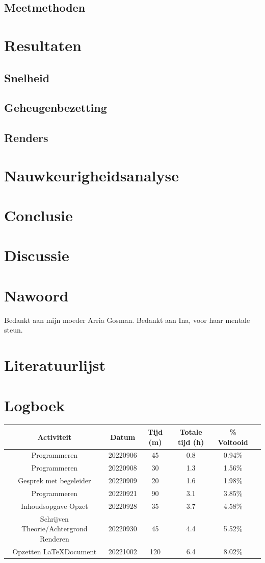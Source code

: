 \documentclass[12pt, a4paper]{article}
\begin{document}
\subsection{Meetmethoden}
\clearpage
\section{Resultaten}
\subsection{Snelheid}
\subsection{Geheugenbezetting}
\subsection{Renders}
\clearpage
\section{Nauwkeurigheidsanalyse}
\clearpage
\section{Conclusie}
\clearpage
\section{Discussie}
\clearpage
\section{Nawoord}
Bedankt aan mijn moeder Arria Gosman.
Bedankt aan Ina, voor haar mentale steun.
\clearpage
\section{Literatuurlijst}


\clearpage
\section{Logboek}
\begin{adjustbox}{angle=270}
\begin{tabular}{ | c | c c c c c | }
\hline
Activiteit & Datum & Tijd (m) & Totale tijd (h) &       \% Voltooid \\
\hline
Programmeren & 20220906 & 45 & 0.8 & 0.94\% \\
Programmeren & 20220908 & 30 & 1.3 & 1.56\% \\
Gesprek met begeleider & 20220909 & 20 & 1.6 & 1.98\% \\
Programmeren & 20220921 & 90 & 3.1 & 3.85\% \\
Inhoudsopgave Opzet & 20220928 & 35 & 3.7 & 4.58\% \\
Schrijven Theorie/Achtergrond Renderen & 20220930 & 45 & 4.4 & 5.52\% \\
Opzetten \LaTeX \space Document & 20221002 & 120 & 6.4 & 8.02\% \\
\hline
\end{tabular}
\end{adjustbox}
\end{document}
